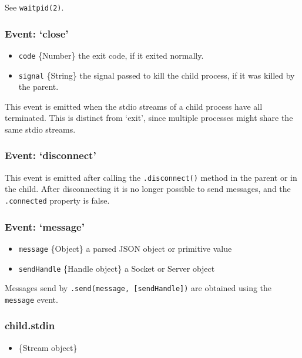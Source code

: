 See \texttt{waitpid(2)}.

\subsubsection{Event: `close'}\label{event-close}

\begin{itemize}
\itemsep1pt\parskip0pt
\item
  \texttt{code} \{Number\} the exit code, if it exited normally.
\item
  \texttt{signal} \{String\} the signal passed to kill the child
  process, if it was killed by the parent.
\end{itemize}

This event is emitted when the stdio streams of a child process have all
terminated. This is distinct from `exit', since multiple processes might
share the same stdio streams.

\subsubsection{Event: `disconnect'}\label{event-disconnect}

This event is emitted after calling the \texttt{.disconnect()} method in
the parent or in the child. After disconnecting it is no longer possible
to send messages, and the \texttt{.connected} property is false.

\subsubsection{Event: `message'}\label{event-message}

\begin{itemize}
\itemsep1pt\parskip0pt
\item
  \texttt{message} \{Object\} a parsed JSON object or primitive value
\item
  \texttt{sendHandle} \{Handle object\} a Socket or Server object
\end{itemize}

Messages send by \texttt{.send(message, {[}sendHandle{]})} are obtained
using the \texttt{message} event.

\subsubsection{child.stdin}\label{child.stdin}

\begin{itemize}
\itemsep1pt\parskip0pt
\item
  \{Stream object\}
\end{itemize}

